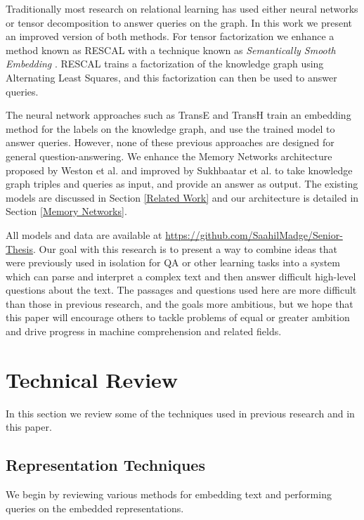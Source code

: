 \documentclass[pageno]{final_paper}
\begin{document}
Traditionally most research on relational learning has used either neural
networks or tensor decomposition to answer queries on the graph. In this work we
present an improved version of both methods. For tensor factorization we enhance
a method known as RESCAL \cite{Bader2007, Nickel2011} with a technique known as
\textit{Semantically Smooth Embedding} \cite{Guo2015}. RESCAL trains a
factorization of the knowledge graph using Alternating Least Squares, and this
factorization can then be used to answer queries.

The neural network approaches such as TransE \cite{Bordes2013} and TransH
\cite{Wang2014} train an embedding method for the labels on the knowledge graph,
and use the trained model to answer queries. However, none of these previous
approaches are designed for general question-answering. We enhance the Memory
Networks architecture proposed by Weston et al. \cite{Weston2015a} and improved
by Sukhbaatar et al. \cite{Sukhbaatar2015} to take knowledge graph triples and
queries as input, and provide an answer as output. The existing models are
discussed in Section \ref{Related Work} and our architecture is detailed in
Section \ref{Memory Networks}.

All models and data are available at
\url{https://github.com/SaahilMadge/Senior-Thesis}. Our goal with this research
is to present a way to combine ideas that were previously used in isolation for
QA or other learning tasks into a system which can parse and interpret a complex
text and then answer difficult high-level questions about the text. The passages
and questions used here are more difficult than those in previous research, and
the goals more ambitious, but we hope that this paper will encourage others to
tackle problems of equal or greater ambition and drive progress in machine
comprehension and related fields.

\section{Technical Review}
\label{Technical Review}

In this section we review some of the techniques used in previous research and
in this paper.

\subsection{Representation Techniques}
\label{Representation Techniques}

We begin by reviewing various methods for embedding text and performing queries
on the embedded representations.
\end{document}
